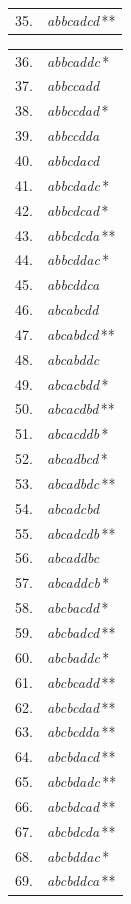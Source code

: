 \begin{center}
\begin{minipage}[t]{.31\linewidth}
\begin{tabular}{r@{\ }l}
35. & \emph{abbcadcd}\,** \\
\end{tabular}\end{minipage}\hfill%
\begin{minipage}[t]{.31\linewidth}\centering
\begin{tabular}{r@{\ }l}
36. & \emph{abbcaddc}\,* \\
37. & \emph{abbccadd} \\
38. & \emph{abbccdad}\,* \\
39. & \emph{abbccdda} \\
40. & \emph{abbcdacd} \\
41. & \emph{abbcdadc}\,* \\
42. & \emph{abbcdcad}\,* \\
43. & \emph{abbcdcda}\,** \\
44. & \emph{abbcddac}\,* \\
45. & \emph{abbcddca} \\
46. & \emph{abcabcdd} \\
47. & \emph{abcabdcd}\,** \\
48. & \emph{abcabddc} \\
49. & \emph{abcacbdd}\,* \\
50. & \emph{abcacdbd}\,** \\
51. & \emph{abcacddb}\,* \\
52. & \emph{abcadbcd}\,* \\
53. & \emph{abcadbdc}\,** \\
54. & \emph{abcadcbd} \\
55. & \emph{abcadcdb}\,** \\
56. & \emph{abcaddbc} \\
57. & \emph{abcaddcb}\,* \\
58. & \emph{abcbacdd}\,* \\
59. & \emph{abcbadcd}\,** \\
60. & \emph{abcbaddc}\,* \\
61. & \emph{abcbcadd}\,** \\
62. & \emph{abcbcdad}\,** \\
63. & \emph{abcbcdda}\,** \\
64. & \emph{abcbdacd}\,** \\
65. & \emph{abcbdadc}\,** \\
66. & \emph{abcbdcad}\,** \\
67. & \emph{abcbdcda}\,** \\
68. & \emph{abcbddac}\,* \\
69. & \emph{abcbddca}\,** \\

\end{tabular}
\end{minipage}
\end{center}
